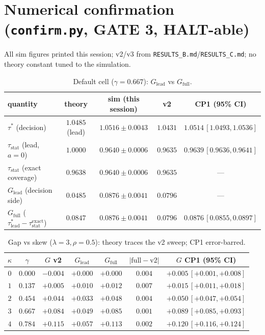 \documentclass[11pt]{article}
\theoremstyle{plain}
\theoremstyle{definition}
\newcommand{\taustat}{\tau_{\mathrm{stat}}}
\newcommand{\taustar}{\tau^{*}}
\begin{document}
\section{Numerical confirmation (\texttt{confirm.py}, GATE 3, HALT-able)}
All sim figures printed this session; v2/v3 from \texttt{RESULTS\_B.md}/\texttt{RESULTS\_C.md}; no theory
constant tuned to the simulation.

\begin{table}[h]\centering
\caption{Default cell ($\gamma=0.667$): $G_{\mathrm{lead}}$ vs $G_{\mathrm{full}}$.}
\label{tab:default}
\small
\begin{tabular}{lcccc}
\toprule
quantity & theory & sim (this session) & v2 & CP1 (95\% CI) \\
\midrule
$\taustar$ (decision) & $1.0485$ (lead) & $1.0516\pm0.0043$ & $1.0431$ & $1.0514\,[1.0493,1.0536]$ \\
$\taustat$ (lead, $a{=}0$) & $1.0000$ & $0.9640\pm0.0006$ & $0.9635$ & $0.9639\,[0.9636,0.9641]$ \\
$\taustat$ (exact coverage) & $0.9638$ & $0.9640\pm0.0006$ & $0.9635$ & --- \\
$G_{\mathrm{lead}}$ (decision side) & $\mathbf{0.0485}$ & $0.0876\pm0.0041$ & $0.0796$ & --- \\
$G_{\mathrm{full}}$ ($\taustar_{\mathrm{lead}}-\taustat^{\mathrm{exact}}$) & $\mathbf{0.0847}$ & $0.0876\pm0.0041$ & $0.0796$ & $0.0876\,[0.0855,0.0897]$ \\
\bottomrule
\end{tabular}
\end{table}

\begin{table}[h]\centering
\caption{Gap vs skew ($\lambda{=}3,\rho{=}0.5$): theory traces the v2 sweep; CP1 error-barred.}
\label{tab:sweep}
\small
\begin{tabular}{ccccccc}
\toprule
$\kappa$ & $\gamma$ & $G$ v2 & $G_{\mathrm{lead}}$ & $G_{\mathrm{full}}$ & $|{\mathrm{full}-\mathrm{v2}}|$ & $G$ CP1 (95\% CI) \\
\midrule
$0$ & $0.000$ & $-0.004$ & $+0.000$ & $+0.000$ & $0.004$ & $+0.005\,[+0.001,+0.008]$ \\
$1$ & $0.137$ & $+0.005$ & $+0.010$ & $+0.012$ & $0.007$ & $+0.015\,[+0.011,+0.018]$ \\
$2$ & $0.454$ & $+0.044$ & $+0.033$ & $+0.048$ & $0.004$ & $+0.050\,[+0.047,+0.054]$ \\
$3$ & $0.667$ & $+0.084$ & $+0.049$ & $+0.085$ & $0.001$ & $+0.089\,[+0.085,+0.093]$ \\
$4$ & $0.784$ & $+0.115$ & $+0.057$ & $+0.113$ & $0.002$ & $+0.120\,[+0.116,+0.124]$ \\
\bottomrule
\end{tabular}
\end{table}
\end{document}
